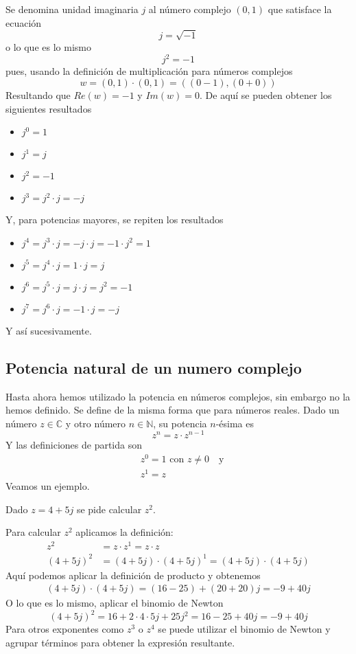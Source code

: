 Se denomina unidad imaginaria $j$ al número complejo $(0,1)$ que satisface la ecuación
$$
j = \sqrt{-1}
$$
o lo que es lo mismo
$$
j^2 = -1
$$
pues, usando la definición de multiplicación para números complejos
$$
w=(0,1)\cdot(0,1)=((0-1),(0+0))
$$
Resultando que $\textit{Re}(w)=-1$ y $\textit{Im}(w)=0$. De aquí se pueden obtener los siguientes resultados
\begin{itemize}
  \item $j^0 = 1$
  \item $j^1 = j$
  \item $j^2 = -1$
  \item $j^3 = j^2\cdot j= -j$
\end{itemize}
Y, para potencias mayores, se repiten los resultados
\begin{itemize}
  \item $j^4=j^3\cdot j = -j\cdot j = -1 \cdot j^2 = 1$
  \item $j^5=j^4\cdot j = 1 \cdot j = j$
  \item $j^6=j^5\cdot j = j \cdot j = j^2 = -1$
  \item $j^7=j^6\cdot j = -1 \cdot j = -j$
\end{itemize}
Y así sucesivamente.

\subsection{Potencia natural de un numero complejo}

Hasta ahora hemos utilizado la potencia en números complejos, sin embargo no la hemos definido. Se define de la misma forma que para números reales. Dado un número $z\in\mathbb{C}$ y otro número $n\in\mathbb{N}$, su potencia $n$-ésima es
$$
z^n = z \cdot z^{n-1}
$$
Y las definiciones de partida son
\begin{align*}
  &z^0 = 1 \text{ con } z\neq 0 \quad \text{y}\\ &z^1 = z
\end{align*}
Veamos un ejemplo.
\begin{example}
  Dado $z=4+5j$ se pide calcular $z^2$.

  Para calcular $z^2$ aplicamos la definición:
  \begin{align*}
    z^2 &= z \cdot z^1 = z \cdot z \\ 
    (4+5j)^2 &= (4+5j)\cdot (4+5j)^1 = (4+5j)\cdot(4+5j)
  \end{align*}
  Aquí podemos aplicar la definición de producto y obtenemos
  \begin{align*}
    (4+5j)\cdot(4+5j)=(16-25)+(20+20)j=-9+40j
  \end{align*}
  O lo que es lo mismo, aplicar el binomio de Newton
  $$
  (4+5j)^2 = 16 + 2\cdot4\cdot5j + 25j^2 = 16-25 + 40j = -9 + 40j
  $$
  Para otros exponentes como $z^3$ o $z^4$ se puede utilizar el binomio de Newton y agrupar términos para obtener la expresión resultante.
\end{example}

